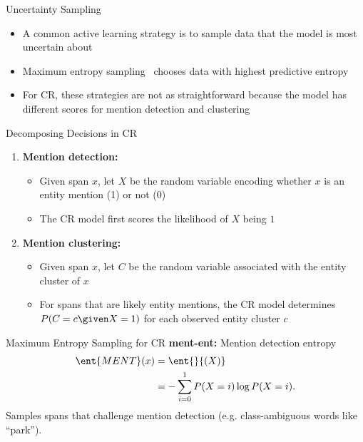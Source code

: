 \begin{frame}{Uncertainty Sampling}
\begin{itemize}
 \item A common active learning strategy is to sample data that the model is most
uncertain about
 \item Maximum entropy sampling~\citep{lewis-1994} chooses data with
highest predictive entropy
 \item For CR, these strategies are not as straightforward because
the model has different scores for mention detection and clustering
\end{itemize}
\end{frame}


\begin{frame}{Decomposing Decisions in CR}

\begin{enumerate}
 \item \textbf{Mention detection:}
    \begin{itemize}
        \item Given span $x$, let $X$ be the random variable encoding whether $x$ is an
entity mention (1) or not (0)
        \item The CR model first scores the likelihood of $X$ being $1$
    \end{itemize}
 \item \textbf{Mention clustering:}
    \begin{itemize}
        \item Given span $x$, let $C$ be the random variable associated with the entity
cluster of $x$
        \item For spans that are likely entity mentions, the CR
model determines $P(C=c \given X=1)$ for each observed entity cluster $c$
    \end{itemize}
\end{enumerate}
\end{frame}

\begin{frame}{Maximum Entropy Sampling for CR}
\textbf{ment-ent:} Mention detection entropy
\begin{align}
    \ent{MENT}(x)
        &= \ent{}{(X)} \\
        &= - \sum_{i=0}^1 P(X=i) \log P(X=i). \nonumber
\end{align}
\vfill
Samples spans that challenge mention detection (e.g. class-ambiguous words like
``park'').
\end{frame}

